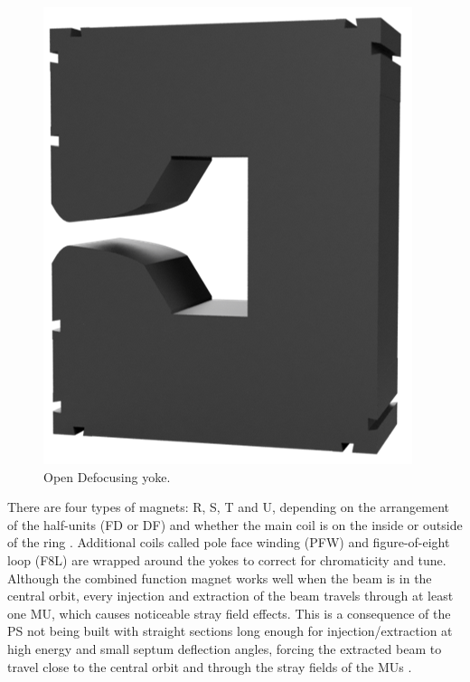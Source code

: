 \documentclass[a4paper,
               biblatex,     %
               keeplastbox,   %
               ]{jacow}
\begin{document}
\begin{figure}[!htb]
  \hfill
  \begin{minipage}[b]{0.45\columnwidth}
    \includegraphics*[width=\textwidth]{MOPOTK030_f2.png}
    \caption{Open Defocusing yoke.}
    \label{fig:defocusing}
  \end{minipage}
\end{figure}

There are four types of magnets: R, S, T and U, depending on the arrangement of the half-units (FD or DF) and whether the main coil is on the inside or outside of the ring \cite{steerenberg_fifty_2011}. Additional coils called pole face winding (PFW) and figure-of-eight loop (F8L) are wrapped around the yokes to correct for chromaticity and tune. Although the combined function magnet works well when the beam is in the central orbit, every injection and extraction of the beam travels through at least one MU, which causes noticeable stray field effects. This is a consequence of the PS not being built with straight sections long enough for injection/extraction at high energy and small septum deflection angles, forcing the extracted beam to travel close to the central orbit and through the stray fields of the MUs \cite{risselada_beam_nodate}.
\end{document}
